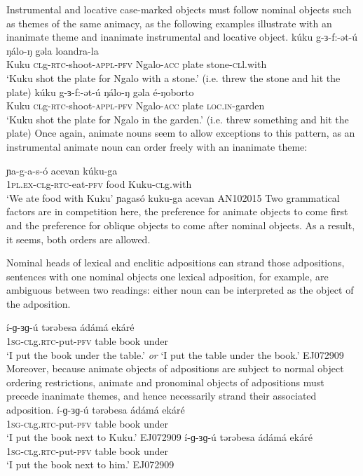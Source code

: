 Instrumental and locative case-marked objects must follow nominal objects such as themes of the same animacy, as the following examples illustrate with an inanimate theme and inanimate instrumental and locative object.
\ea 
\ea \gll kúku g-ɜ-f:-ət-ú ŋálo-ŋ gəla loandra-la\\
Kuku \textsc{cl}g-\textsc{rtc}-shoot-\textsc{appl-pfv} Ngalo-\textsc{acc} plate stone-\textsc{cl}l.with\\ 
\glt `Kuku shot the plate for Ngalo with a stone.' (i.e. threw the stone and hit the plate)
\z 
\ea \gll kúku g-ɜ-f:-ət-ú ŋálo-ŋ gəla é-ŋoborto\\
Kuku \textsc{cl}g-\textsc{rtc}-shoot-\textsc{appl-pfv} Ngalo-\textsc{acc} plate \textsc{loc.in}-garden\\ 
\glt `Kuku shot the plate for Ngalo in the garden.' (i.e. threw something and hit the plate)
\z 
\z 
Once again, animate nouns seem to allow exceptions  to this pattern, as an instrumental animate noun can order freely with an inanimate theme:

\ea 
\ea \gll ɲa-g-a-s-ó acevan kúku-ga\\
	\textsc{1pl.ex}-\textsc{cl}g-\textsc{rtc}-eat-\textsc{pfv} food Kuku-\textsc{cl}g.with\\
	\glt `We ate food with Kuku'
\ex ɲagasó kuku-ga acevan  	\hfill AN102015
\z 
\z 
Two grammatical factors are in competition here, the preference for animate objects to come first and the preference for oblique objects to come after nominal objects. As a result, it seems, both orders are allowed.

Nominal heads of lexical and enclitic adpositions can strand those adpositions, sentences with one nominal objects one lexical adposition, for example, are ambiguous between two readings: either noun can be interpreted as the object of the adposition. 

\ea \gll 	í-ɡ-ɜɡ-ú	tərəbesa	\'ad\'am\'a	ekáré \\ 
	\textsc{1sg-cl}g.\textsc{rtc}-put-\textsc{pfv}	table		book	under \\
	\glt	`I put the book under the table.' \textit{or}
	`I put the table under the book.' \hfill EJ072909
	\glt 
\z
Moreover, because animate objects of adpositions are subject to normal object ordering restrictions, animate and pronominal objects of adpositions must precede inanimate themes, and hence necessarily strand their associated adposition. %
\ea  \gll 	í-ɡ-ɜɡ-ú	tərəbesa	\'ad\'am\'a	ekáré \\ 
	\textsc{1sg-cl}g.\textsc{rtc}-put-\textsc{pfv}	table		book	under \\
	\glt	`I put the book next to Kuku.' \hfill EJ072909
	\glt 
\ex \gll 	í-ɡ-ɜɡ-ú	tərəbesa	\'ad\'am\'a	ekáré \\ 
	\textsc{1sg-cl}g.\textsc{rtc}-put-\textsc{pfv}	table		book	under \\
	\glt
	`I put the book next to him.' \hfill EJ072909
	\glt 
\z

